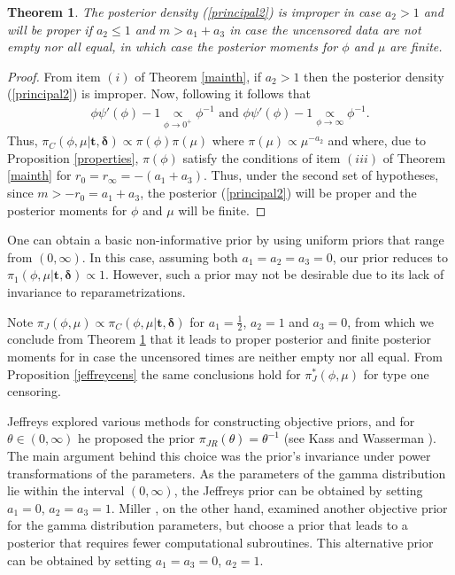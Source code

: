 \documentclass[]{interact}
\theoremstyle{plain}%
\newtheorem{theorem}{Theorem}[section]
\theoremstyle{definition}
\theoremstyle{remark}
\begin{document}
\begin{theorem}\label{principalnow} The posterior density (\ref{principal2}) is improper in case $a_2>1$ and will be proper if $a_2\leq 1$ and $m>a_1+a_3$ in case the uncensored data are not empty nor all equal, in which case the posterior moments for $\phi$ and $\mu$ are finite.
\end{theorem}
\begin{proof} From item $(i)$ of Theorem \ref{mainth}, if $a_2>1$ then the posterior density (\ref{principal2}) is improper. Now, following \cite{ramos2021posterior} it follows that
\begin{align*}
\phi \psi'(\phi) - 1 \underset{\phi\to 0^+}{\propto} \phi^{-1}\mbox{ and }
\phi\psi'(\phi) - 1 \underset{\phi\to \infty}{\propto} \phi^{-1}.
\end{align*}
Thus, $\pi_C(\phi,\mu|\boldsymbol{t,\delta})\propto \pi(\phi)\pi(\mu)$ where $\pi(\mu)\propto \mu^{-a_2}$ and where, due to Proposition \ref{properties}, $\pi(\phi)$ satisfy the conditions of item $(iii)$ of Theorem \ref{mainth} for $r_0=r_\infty=-(a_1+a_3)$. Thus, under the second set of hypotheses, since $m>-r_0=a_1+a_3$, the posterior (\ref{principal2}) will be proper and the posterior moments for $\phi$ and $\mu$ will be finite.
\end{proof}

One can obtain a basic non-informative prior by using uniform priors that range from $(0,\infty)$. In this case, assuming both $a_1=a_2=a_3=0$, our prior reduces to $\pi_1(\phi,\mu|\boldsymbol{t,\delta})\propto 1$. However, such a prior may not be desirable due to its lack of invariance to reparametrizations.

Note $\pi_J\left(\phi,\mu\right) \propto \pi_C(\phi,\mu|\boldsymbol{t,\delta})$ for $a_1=\frac{1}{2}$, $a_2=1$ and $a_3=0$, from which we conclude from Theorem \ref{principalnow} that it leads to proper posterior and finite posterior moments for in case the uncensored times are neither empty nor all equal. From Proposition \ref{jeffreycens} the same conclusions hold for $\pi_J^*\left(\phi,\mu\right)$ for type one censoring.


Jeffreys explored various methods for constructing objective priors, and for $\theta\in(0,\infty)$ he proposed the prior \textcolor{black}{$\pi_{JR}(\theta)=\theta^{-1}$} (see Kass and Wasserman \cite{kass1996selection}). The main argument behind this choice was the prior's invariance under power transformations of the parameters. As the parameters of the gamma distribution lie within the interval $(0,\infty)$, the Jeffreys prior can be obtained by setting $a_1=0$, $a_2=a_3=1$. Miller \cite{miller1980bayesian}, on the other hand, examined another objective prior for the gamma distribution parameters, but choose a prior that leads to a posterior that requires fewer computational subroutines. This alternative prior can be obtained by setting $a_1=a_3=0$, $a_2=1$.
\end{document}
